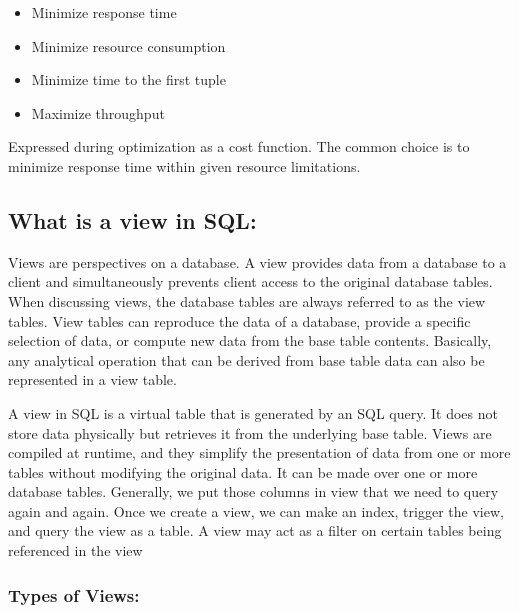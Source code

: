 \begin{itemize}
    \item Minimize response time
    \item Minimize resource consumption
    \item Minimize time to the first tuple
    \item Maximize throughput
\end{itemize}\vspace{.4cm}

Expressed during optimization as a cost function. The common choice is to minimize response time within given resource limitations.



\subsection{What is a view in SQL:}
Views are perspectives on a database. A view provides data from a database to a client and simultaneously prevents client access to the original database tables. When discussing views, the database tables are always referred to as the view tables. View tables can reproduce the data of a database, provide a specific selection of data, or compute new data from the base table contents. Basically, any analytical operation that can be derived from base table data can also be represented in a view table.\vspace{.4cm}

A view in SQL is a virtual table that is generated by an SQL query. It does not store data physically but retrieves it from the underlying base table. Views are compiled at runtime, and they simplify the presentation of data from one or more tables without modifying the original data. It can be made over one or more database tables. Generally, we put those columns in view that we need to query again and again. Once we create a view, we can make an index, trigger the view, and query the view as a table. A view may act as a filter on certain tables being referenced in the view \cite{chauhan-2024,Rohan_Vats-2024}

\subsubsection{Types of Views:}

